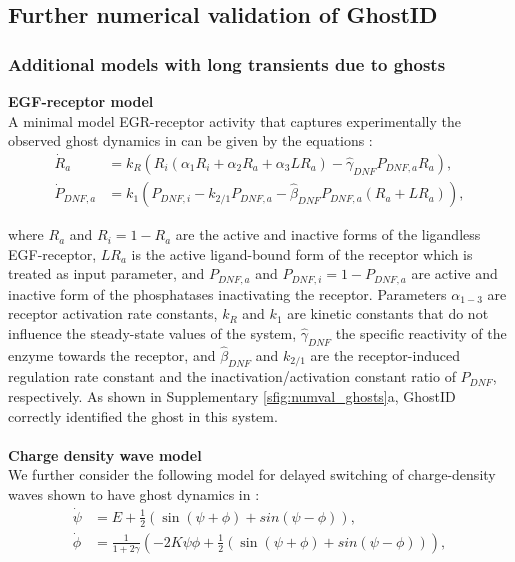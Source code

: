 \documentclass{article}
\theoremstyle{definition}
\begin{document}
\begin{refsection}
\subsection{Further numerical validation of GhostID}\label{subsection:numVal}

\subsubsection{Additional models with long transients due to ghosts}\label{subsection:numVal_ghosts}

\textbf{EGF-receptor model}\\
A minimal model EGR-receptor activity that captures experimentally the observed ghost dynamics in \cite{Stanoev2018} can be given by the equations \cite{Stanoev_2020}:
\begin{align*}
\dot R_a &= k_R(R_i(\alpha_1R_i + \alpha_2 R_a + \alpha_3 LR_a)-\hat{\gamma}_{DNF}P_{DNF,a}R_a),\\
\dot P_{DNF,a} &=k_1(P_{DNF,i}-k_{2/1}P_{DNF,a}-\hat{\beta}_{DNF}P_{DNF,a}(R_a+LR_a)),
\end{align*}

where $R_a$ and $R_i=1-R_a$ are the active and inactive forms of the ligandless EGF-receptor, $LR_a$ is the active ligand-bound form of the receptor which is treated as input parameter, and $P_{DNF,a}$ and $P_{DNF,i} = 1-P_{DNF,a}$ are active and inactive form of the phosphatases inactivating the receptor. Parameters $\alpha_{1-3}$ are receptor activation rate constants, $k_R$ and $k_1$ are kinetic constants that do not influence the steady-state values of the system, $\hat{\gamma}_{DNF}$ the specific reactivity of the enzyme towards the receptor, and $\hat{\beta}_{DNF}$ and $k_{2/1}$ are the receptor-induced regulation rate constant and the inactivation/activation constant ratio of $P_{DNF}$, respectively. As shown in Supplementary \autoref{sfig:numval_ghosts}a, GhostID correctly identified the ghost in this system.
\\ \\

\textbf{Charge density wave model}\\
We further consider the following model for delayed switching of charge-density waves shown to have ghost dynamics in \cite{Strogatz1989}:
\begin{align*}
\dot \psi &= E + \frac{1}{2}(\sin(\psi+\phi)+sin(\psi-\phi)),\\
\dot \phi &= \frac{1}{1+2\gamma}(-2K\psi\phi + \frac{1}{2}(\sin(\psi+\phi)+sin(\psi-\phi))),
\end{align*}


\end{refsection}
\end{document}
